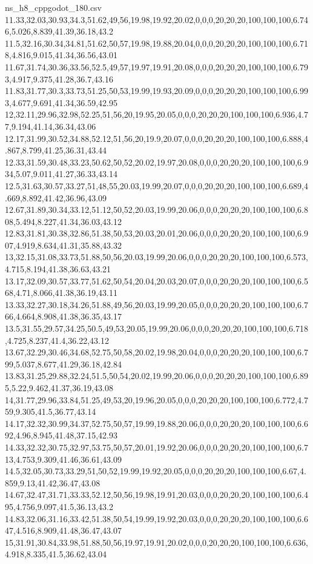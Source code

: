 \begin{filecontents*}[overwrite]{ns_h8_cppgodot_180.csv}
11.33,32.03,30.93,34.3,51.62,49,56,19.98,19.92,20.02,0,0,0,20,20,20,100,100,100,6.746,5.026,8.839,41.39,36.18,43.2
11.5,32.16,30.34,34.81,51.62,50,57,19.98,19.88,20.04,0,0,0,20,20,20,100,100,100,6.718,4.816,9.015,41.34,36.56,43.01
11.67,31.74,30.36,33.56,52.5,49,57,19.97,19.91,20.08,0,0,0,20,20,20,100,100,100,6.793,4.917,9.375,41.28,36.7,43.16
11.83,31.77,30.3,33.73,51.25,50,53,19.99,19.93,20.09,0,0,0,20,20,20,100,100,100,6.993,4.677,9.691,41.34,36.59,42.95
12,32.11,29.96,32.98,52.25,51,56,20,19.95,20.05,0,0,0,20,20,20,100,100,100,6.936,4.77,9.194,41.14,36.34,43.06
12.17,31.99,30.52,34.88,52.12,51,56,20,19.9,20.07,0,0,0,20,20,20,100,100,100,6.888,4.867,8.799,41.25,36.31,43.44
12.33,31.59,30.48,33.23,50.62,50,52,20.02,19.97,20.08,0,0,0,20,20,20,100,100,100,6.934,5.07,9.011,41.27,36.33,43.14
12.5,31.63,30.57,33.27,51,48,55,20.03,19.99,20.07,0,0,0,20,20,20,100,100,100,6.689,4.669,8.892,41.42,36.96,43.09
12.67,31.89,30.34,33.12,51.12,50,52,20.03,19.99,20.06,0,0,0,20,20,20,100,100,100,6.808,5.494,8.227,41.34,36.03,43.12
12.83,31.81,30.38,32.86,51.38,50,53,20.03,20.01,20.06,0,0,0,20,20,20,100,100,100,6.907,4.919,8.634,41.31,35.88,43.32
13,32.15,31.08,33.73,51.88,50,56,20.03,19.99,20.06,0,0,0,20,20,20,100,100,100,6.573,4.715,8.194,41.38,36.63,43.21
13.17,32.09,30.57,33.77,51.62,50,54,20.04,20.03,20.07,0,0,0,20,20,20,100,100,100,6.568,4.71,8.066,41.38,36.19,43.11
13.33,32.27,30.18,34.26,51.88,49,56,20.03,19.99,20.05,0,0,0,20,20,20,100,100,100,6.766,4.664,8.908,41.38,36.35,43.17
13.5,31.55,29.57,34.25,50.5,49,53,20.05,19.99,20.06,0,0,0,20,20,20,100,100,100,6.718,4.725,8.237,41.4,36.22,43.12
13.67,32.29,30.46,34.68,52.75,50,58,20.02,19.98,20.04,0,0,0,20,20,20,100,100,100,6.799,5.037,8.677,41.29,36.18,42.84
13.83,31.25,29.88,32.24,51.5,50,54,20.02,19.99,20.06,0,0,0,20,20,20,100,100,100,6.895,5.22,9.462,41.37,36.19,43.08
14,31.77,29.96,33.84,51.25,49,53,20,19.96,20.05,0,0,0,20,20,20,100,100,100,6.772,4.759,9.305,41.5,36.77,43.14
14.17,32.32,30.99,34.37,52.75,50,57,19.99,19.88,20.06,0,0,0,20,20,20,100,100,100,6.692,4.96,8.945,41.48,37.15,42.93
14.33,32.32,30.75,32.97,53.75,50,57,20.01,19.92,20.06,0,0,0,20,20,20,100,100,100,6.713,4.753,9.309,41.46,36.61,43.09
14.5,32.05,30.73,33.29,51,50,52,19.99,19.92,20.05,0,0,0,20,20,20,100,100,100,6.67,4.859,9.13,41.42,36.47,43.08
14.67,32.47,31.71,33.33,52.12,50,56,19.98,19.91,20.03,0,0,0,20,20,20,100,100,100,6.495,4.756,9.097,41.5,36.13,43.2
14.83,32.06,31.16,33.42,51.38,50,54,19.99,19.92,20.03,0,0,0,20,20,20,100,100,100,6.647,4.516,8.909,41.48,36.47,43.07
15,31.91,30.84,33.98,51.88,50,56,19.97,19.91,20.02,0,0,0,20,20,20,100,100,100,6.636,4.918,8.335,41.5,36.62,43.04

\end{filecontents*}
